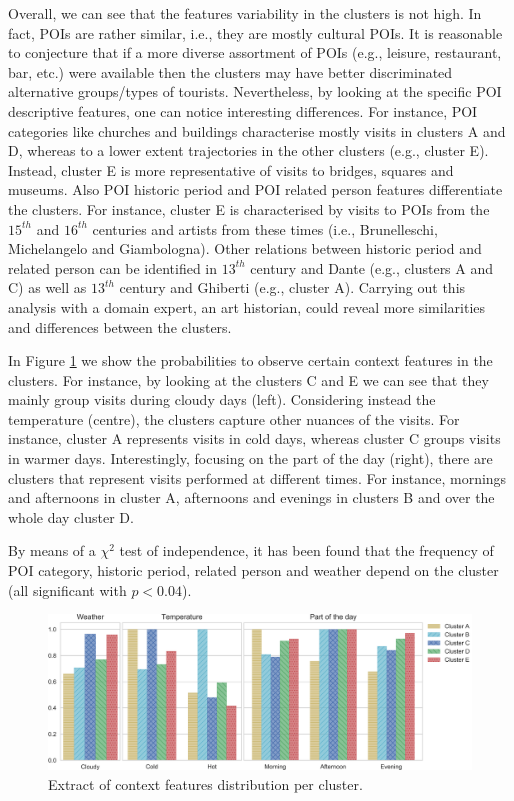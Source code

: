 Overall, we can see that the features variability in the clusters is not high. In fact, POIs are rather similar, i.e., they are mostly cultural POIs. It is reasonable to conjecture that if a more diverse assortment of POIs (e.g., leisure, restaurant, bar, etc.) were available then the clusters may have better discriminated alternative groups/types of tourists. Nevertheless, by looking at the specific POI descriptive features, one can notice interesting differences. For instance, POI categories like churches and buildings characterise mostly visits in clusters A and D, whereas to a lower extent trajectories in the other clusters (e.g., cluster E). Instead, cluster E is more representative of visits to bridges, squares and museums. Also POI historic period and POI related person features differentiate the clusters. For instance, cluster E is characterised by visits to POIs from the $15^{th}$ and $16^{th}$ centuries and artists from these times (i.e., Brunelleschi, Michelangelo and Giambologna).
Other relations between historic period and related person can be identified in $13^{th}$ century and Dante (e.g., clusters A and C) as well as $13^{th}$ century and Ghiberti (e.g., cluster A). Carrying out this analysis with a domain expert, an art historian, could reveal more similarities and differences between the clusters. 

In Figure \ref{fig:cluster_contex} we show the probabilities to observe certain context features in the clusters. For instance, by looking at the clusters C and E we can see that they mainly group  visits during cloudy days (left). Considering instead the temperature (centre), the clusters capture other nuances of the visits. For instance, cluster A represents visits in cold days, whereas cluster C groups visits in warmer days. Interestingly, focusing on the part of the day (right), there are clusters that represent visits performed at different times. For instance, mornings and afternoons in cluster A, afternoons and evenings in clusters B and over the whole day cluster D. 

By means of a $\chi^2$ test of independence, it has been found that the frequency of POI category, historic period, related person and weather depend on the cluster (all significant with $p<0.04$).

\begin{figure}
	\centering
	\includegraphics[width=1\linewidth]{cluster_comparison_contextfeatures}
	\caption{Extract of context features distribution per cluster.}
	\label{fig:cluster_contex}
\end{figure}

